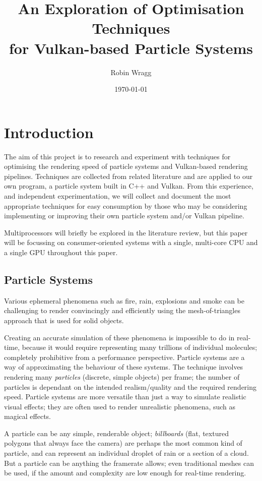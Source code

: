 \documentclass[11pt, a4paper, twocolumn]{article}
\title{\sffamily\bfseries An Exploration of Optimisation Techniques\\for Vulkan-based Particle Systems}
\author{Robin Wragg}
\date{\today}
\begin{document}
\maketitle

\section{Introduction}

The aim of this project is to research and experiment with techniques for optimising the rendering speed of particle systems and Vulkan-based rendering pipelines. Techniques are collected from related literature and are applied to our own program, a particle system built in C++ and Vulkan. From this experience, and independent experimentation, we will collect and document the most appropriate techniques for easy consumption by those who may be considering implementing or improving their own particle system and/or Vulkan pipeline.

Multiprocessors will briefly be explored in the literature review, but this paper will be focussing on consumer-oriented systems with a single, multi-core CPU and a single GPU throughout this paper.

\subsection{Particle Systems}

Various ephemeral phenomena such as fire, rain, explosions and smoke can be challenging to render convincingly and efficiently using the mesh-of-triangles approach that is used for solid objects.

Creating an accurate simulation of these phenomena is impossible to do in real-time, because it would require representing many trillions of individual molecules; completely prohibitive from a performance perspective. Particle systems are a way of approximating the behaviour of these systems. The technique involves rendering many \emph{particles} (discrete, simple objects) per frame; the number of particles is dependant on the intended realism/quality and the required rendering speed. Particle systems are more versatile than just a way to simulate realistic visual effects; they are often used to render unrealistic phenomena, such as magical effects.

A particle can be any simple, renderable object; \emph{billboards} (flat, textured polygons that always face the camera) are perhaps the most common kind of particle, and can represent an individual droplet of rain or a section of a cloud. But a particle can be anything the framerate allows; even traditional meshes can be used, if the amount and complexity are low enough for real-time rendering.
\end{document}
